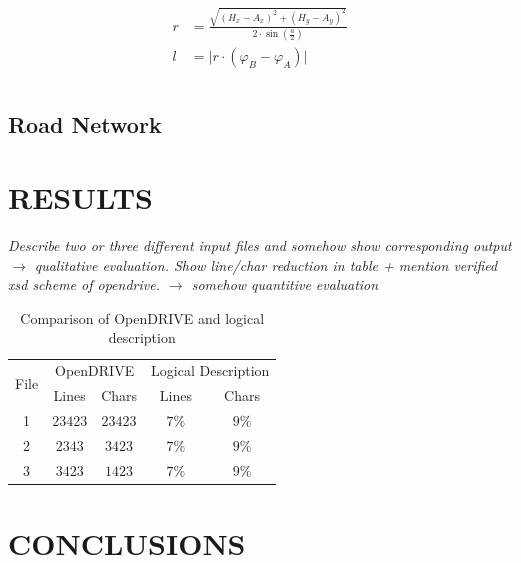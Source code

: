 \documentclass[a4paper, 10pt, conference]{ieeeconf}      %
\begin{document}
    \begin{align}
        \begin{split}           
        r &= \frac{\sqrt{\left(H_x - A_x\right)^2 + \left(H_y - A_y\right)^2}}{2 \cdot \sin\left(\frac{a}{2}\right)} \\
        l &= \vert r \cdot \left(\varphi_B - \varphi_A\right) \vert \\  
        \end{split}
    \end{align}


\subsection{Road Network}

\clearpage %
\section{RESULTS}
\textit{Describe two or three different input files and somehow show corresponding output $\rightarrow$ qualitative evaluation. Show line/char reduction in table + mention verified xsd scheme of opendrive. $\rightarrow$ somehow quantitive evaluation}
\begin{table}[h]
\caption{Comparison of OpenDRIVE and logical description}
\label{tab_comparison}
\def\arraystretch{1.5}
\begin{center}
\begin{tabular}{c|cccc}
\multirow{2}{*}{File} & \multicolumn{2}{c}{OpenDRIVE} & \multicolumn{2}{c}{Logical Description}\\
& Lines & Chars & Lines & Chars \\
\hline
1 & $23423$ & $23423$& $7\%$ &$9\%$\\
2 & $2343$ & $3423$& $7\%$ &$9\%$\\
3 & $3423$ & $1423$& $7\%$ &$9\%$
\end{tabular}
\end{center}
\end{table}

\section{CONCLUSIONS}

\addtolength{\textheight}{-12cm}   %
\end{document}
